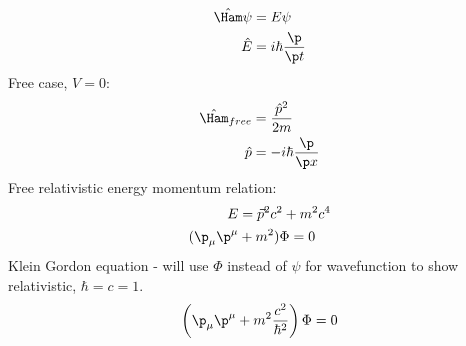 \documentclass[a4paper, 11pt, normalem]{report}
\begin{document}
\chapter{}
\begin{align}
    \hat{\Ham}\psi &= E\psi \\
    \hat{E} &= i\hbar\frac{\p}{\p t} 
\end{align}
Free case, $V = 0$:
\begin{align}
    \hat{\Ham}_{free} &= \frac{\hat{p}^2}{2m} \\
    \hat{p} &= -i\hbar\frac{\p}{\p x}
\end{align}
Free relativistic energy momentum relation:
\begin{align}
    E &= \vec{p}^2c^2 + m^2c^4 \\
    (\p_\mu\p^\mu &+ m^2)\Phi = 0
\end{align}
Klein Gordon equation - will use $\Phi$ instead of $\psi$ for wavefunction to show relativistic, $\hbar = c = 1$.
\begin{equation}
    \left(\p_\mu\p^\mu + m^2\frac{c^2}{\hbar^2}\right)\Phi = 0
\end{equation}
\end{document}
